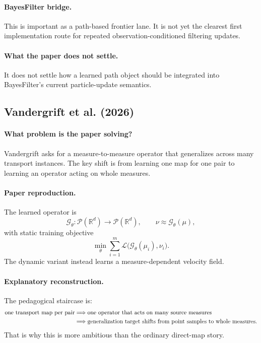 \documentclass[11pt]{report}
\newcommand{\R}{\mathbb{R}}
\newcommand{\calP}{\mathcal{P}}
\begin{document}
\paragraph{BayesFilter bridge.}
This is important as a path-based frontier lane.  It is not yet the clearest first
implementation route for repeated observation-conditioned filtering updates.

\paragraph{What the paper does not settle.}
It does not settle how a learned path object should be integrated into BayesFilter's
current particle-update semantics.

\subsection*{Vandergrift et al. (2026)}

\paragraph{What problem is the paper solving?}
Vandergrift asks for a measure-to-measure operator that generalizes across many
transport instances.  The key shift is from learning one map for one pair to
learning an operator acting on whole measures.

\paragraph{Paper reproduction.}
The learned operator is
\begin{equation}
\mathcal G_\theta : \calP(\R^d)\to\calP(\R^d),
\qquad
\nu\approx \mathcal G_\theta(\mu),
\label{eq:vandergrift-operator}
\end{equation}
with static training objective
\begin{equation}
\min_\theta \sum_{i=1}^{m}\mathcal L\bigl(\mathcal G_\theta(\mu_i),\nu_i\bigr).
\label{eq:vandergrift-loss}
\end{equation}
The dynamic variant instead learns a measure-dependent velocity field.

\paragraph{Explanatory reconstruction.}
The pedagogical staircase is:
\begin{align}
\text{one transport map per pair}
&\Longrightarrow
\text{one operator that acts on many source measures}
\notag\\
&\Longrightarrow
\text{generalization target shifts from point samples to whole measures}.
\label{eq:vandergrift-logic}
\end{align}
That is why this is more ambitious than the ordinary direct-map story.
\end{document}
